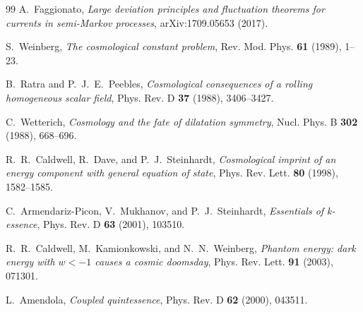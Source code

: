 \documentclass[11pt]{article}
\theoremstyle{definition}
\theoremstyle{remark}
\begin{document}
\begin{thebibliography}{99}
A.~Faggionato,
\emph{Large deviation principles and fluctuation theorems for currents in
semi-Markov processes},
arXiv:1709.05653 (2017).

S.~Weinberg,
\emph{The cosmological constant problem},
Rev. Mod. Phys. \textbf{61} (1989), 1--23.

B.~Ratra and P.~J.~E.~Peebles,
\emph{Cosmological consequences of a rolling homogeneous scalar field},
Phys. Rev. D \textbf{37} (1988), 3406--3427.

C.~Wetterich,
\emph{Cosmology and the fate of dilatation symmetry},
Nucl. Phys. B \textbf{302} (1988), 668--696.

R.~R.~Caldwell, R.~Dave, and P.~J.~Steinhardt,
\emph{Cosmological imprint of an energy component with general equation of state},
Phys. Rev. Lett. \textbf{80} (1998), 1582--1585.

C.~Armendariz-Picon, V.~Mukhanov, and P.~J.~Steinhardt,
\emph{Essentials of k-essence},
Phys. Rev. D \textbf{63} (2001), 103510.

R.~R.~Caldwell, M.~Kamionkowski, and N.~N.~Weinberg,
\emph{Phantom energy: dark energy with $w<-1$ causes a cosmic doomsday},
Phys. Rev. Lett. \textbf{91} (2003), 071301.

L.~Amendola,
\emph{Coupled quintessence},
Phys. Rev. D \textbf{62} (2000), 043511.

\end{thebibliography}
\end{document}
